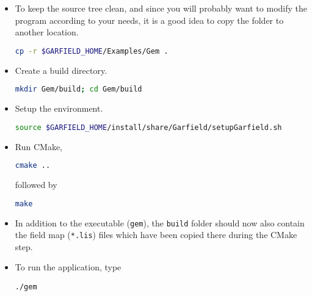 \begin{itemize}
  \item
  To keep the source tree clean, and since you will probably want to modify 
  the program according to your needs, it is a good idea to copy 
  the folder to another location.
\begin{lstlisting}[language=bash]
cp -r $GARFIELD_HOME/Examples/Gem .
\end{lstlisting} 
  \item
  Create a build directory.
\begin{lstlisting}[language=bash]
mkdir Gem/build; cd Gem/build
\end{lstlisting} 
  \item
  Setup the environment.
\begin{lstlisting}[language=bash]
source $GARFIELD_HOME/install/share/Garfield/setupGarfield.sh
\end{lstlisting}
  \item
  Run CMake,
\begin{lstlisting}[language=bash]
cmake ..
\end{lstlisting} 
  followed by
\begin{lstlisting}[language=bash]
make
\end{lstlisting}
  \item
  In addition to the executable (\texttt{gem}), the \texttt{build} 
  folder should now also contain the field map (\texttt{*.lis}) 
  files which have been copied there during the CMake step.
  \item
  To run the application, type
\begin{lstlisting}
./gem
\end{lstlisting}
\end{itemize}
%
%


